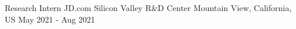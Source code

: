 \begin{cventries}

\cventry
{Research Intern} %
{JD.com Silicon Valley R\&D Center} %
{Mountain View, California, US} %
{May 2021 - Aug 2021} %
{ %
}


\end{cventries}